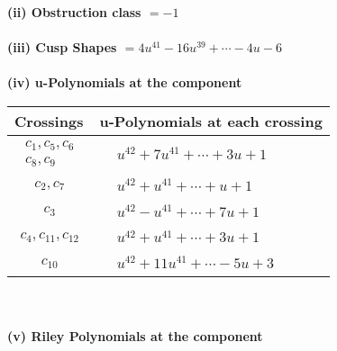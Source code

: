 \documentclass[1p]{elsarticle_modified}
\theoremstyle{definition}
\begin{document}
\flushleft \textbf{(ii) Obstruction class $= -1$}\\~\\
\flushleft \textbf{(iii) Cusp Shapes $= 4 u^{41}-16 u^{39}+\cdots-4 u-6$}\\~\\
\newpage\renewcommand{\arraystretch}{1}
\flushleft \textbf{(iv) u-Polynomials at the component}\newline \\
\begin{tabular}{m{50pt}|m{274pt}}
Crossings & \hspace{64pt}u-Polynomials at each crossing \\
\hline $$\begin{aligned}c_{1},c_{5},c_{6}\\c_{8},c_{9}\end{aligned}$$&$\begin{aligned}
&u^{42}+7 u^{41}+\cdots+3 u+1
\end{aligned}$\\
\hline $$\begin{aligned}c_{2},c_{7}\end{aligned}$$&$\begin{aligned}
&u^{42}+u^{41}+\cdots+u+1
\end{aligned}$\\
\hline $$\begin{aligned}c_{3}\end{aligned}$$&$\begin{aligned}
&u^{42}- u^{41}+\cdots+7 u+1
\end{aligned}$\\
\hline $$\begin{aligned}c_{4},c_{11},c_{12}\end{aligned}$$&$\begin{aligned}
&u^{42}+u^{41}+\cdots+3 u+1
\end{aligned}$\\
\hline $$\begin{aligned}c_{10}\end{aligned}$$&$\begin{aligned}
&u^{42}+11 u^{41}+\cdots-5 u+3
\end{aligned}$\\
\hline
\end{tabular}\\~\\
\newpage\renewcommand{\arraystretch}{1}
\flushleft \textbf{(v) Riley Polynomials at the component}\newline \\
\end{document}
